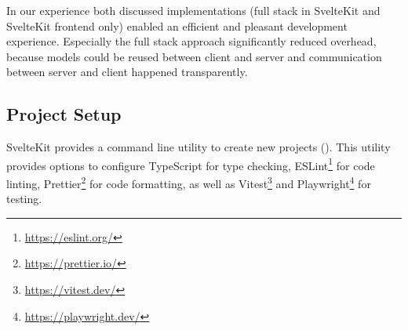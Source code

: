 In our experience both discussed implementations (full stack in SvelteKit and SvelteKit frontend only) enabled an efficient and pleasant development experience. Especially the full stack approach significantly reduced overhead, because models could be reused between client and server and communication between server and client happened transparently.


\subsection{Project Setup}

SvelteKit provides a command line utility to create new projects (). This utility provides options to configure TypeScript for type checking, ESLint\footnote{\url{https://eslint.org/}} for code linting, Prettier\footnote{\url{https://prettier.io/}} for code formatting, as well as Vitest\footnote{\url{https://vitest.dev/}} and Playwright\footnote{\url{https://playwright.dev/}} for testing. 



